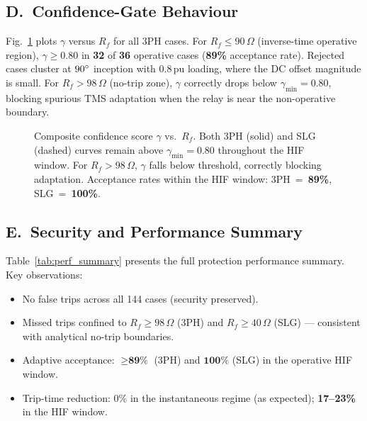 \documentclass[10pt,journal,twoside]{IEEEtran}
\newcommand{\Rf}{R_{\!f}}
\newcommand{\gammin}{\gamma_{\min}}
\begin{document}
\subsection{D.\ Confidence-Gate Behaviour}
\label{sec:results:confidence}

Fig.~\ref{fig:confidence} plots $\gamma$ versus $\Rf$ for all 3PH cases.
For $\Rf \leq 90\,\Omega$ (inverse-time operative region),
$\gamma \geq 0.80$ in \textbf{32} of \textbf{36} operative cases
(\textbf{89\%} acceptance rate).  Rejected cases cluster at
$90\degree$ inception with 0.8\,pu loading, where the DC offset magnitude
is small.  For $\Rf > 98\,\Omega$ (no-trip zone), $\gamma$ correctly drops
below $\gammin = 0.80$, blocking spurious TMS adaptation when the relay
is near the non-operative boundary.

\begin{figure}[!t]
\centering

\caption{Composite confidence score $\gamma$ vs.\ $\Rf$.  Both 3PH (solid)
  and SLG (dashed) curves remain above $\gammin = 0.80$ throughout the HIF
  window.  For $\Rf > 98\,\Omega$, $\gamma$ falls below threshold, correctly
  blocking adaptation.  Acceptance rates within the HIF window: 3PH~=~\textbf{89\%},
  SLG~=~\textbf{100\%}.}
\label{fig:confidence}
\end{figure}

\subsection{E.\ Security and Performance Summary}
\label{sec:results:table}

Table~\ref{tab:perf_summary} presents the full protection performance
summary.  Key observations:
\begin{itemize}
  \item No false trips across all 144 cases (security preserved).
  \item Missed trips confined to $\Rf \geq 98\,\Omega$ (3PH) and
        $\Rf \geq 40\,\Omega$ (SLG) --- consistent with analytical no-trip
        boundaries.
  \item Adaptive acceptance: $\geq \textbf{89\%}$ (3PH) and $\textbf{100\%}$ (SLG) in the operative HIF window.
  \item Trip-time reduction: 0\% in the instantaneous regime (as expected);
        \textbf{17--23\%} in the HIF window.
\end{itemize}
\end{document}
